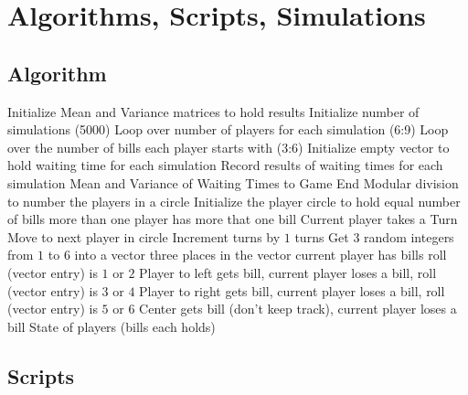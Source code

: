\documentclass[12pt]{article}
\begin{document}
\hr

\section*{Algorithms, Scripts, Simulations}

\subsection*{Algorithm}

\begin{codebox}
     \li
    Initialize Mean and Variance matrices to hold results \li Initialize
    number of simulations (5000) \li Loop over number of players for
    each simulation (6:9) \li Loop over the number of bills each player
    starts with (3:6) \li Initialize empty vector to hold waiting time
    for each simulation \li Record results of waiting times for each
    simulation \li \Return Mean and Variance of Waiting Times to Game
    End  \li Modular division to number the
    players in a circle  \li Initialize the player circle
    to hold equal number of bills \li \While more than one player has
    more that one bill \li Current player takes a Turn \li Move to next
    player in circle \li Increment turns by \( 1 \) \li
    \End \li \Return turns  \li Get \( 3 \) random
    integers from \( 1 \) to \( 6 \) into a vector \li \For three places
    in the vector \li \If current player has bills \li \If roll (vector
    entry) is \( 1 \) or \( 2 \) \li Player to left gets bill, current
    player loses a bill, \li \If roll (vector entry) is \( 3 \) or \( 4 \)
    \li Player to right gets bill, current player loses a bill, \li \If
    roll (vector entry) is \( 5 \) or \( 6 \) \li Center gets bill (don't
    keep track), current player loses a bill \li \Return State of players (bills
    each holds)
\end{codebox}

\subsection*{Scripts}



\hr

\end{document}
